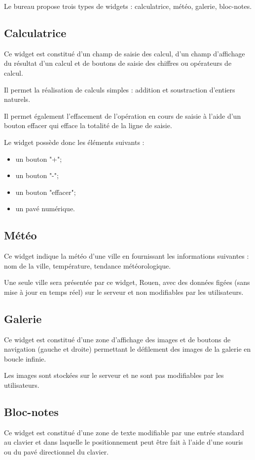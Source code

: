 Le bureau propose {\color{yellow}trois} types de widgets : {\color{red}calculatrice,} météo, galerie, bloc-notes.
{\color{red}
\subsection*{Calculatrice}

Ce widget est constitué d'un champ de saisie des calcul, d'un champ d'affichage du résultat d'un calcul et de boutons de saisie des chiffres ou opérateurs de calcul.

Il permet la réalisation de calculs simples : addition et soustraction d'entiers naturels.

Il permet également l'effacement de l'opération en cours de saisie à l'aide d'un bouton effacer qui efface la totalité de la ligne de saisie.

Le widget possède donc les éléments suivants :
\begin{itemize}
\item un bouton "+";
\item un bouton "-";
\item un bouton "effacer";
\item un pavé numérique.
\end{itemize}
}
\subsection*{Météo}
Ce widget indique la météo d'une ville en fournissant les informations suivantes : nom de la ville, température, tendance météorologique.

Une seule ville sera présentée par ce widget, Rouen, avec des données figées (sans mise à jour en temps réel) sur le serveur et non modifiables par les utilisateurs.

\subsection*{Galerie}
Ce widget est constitué d'une zone d'affichage des images et de boutons de navigation (gauche et droite) permettant le défilement des images de la galerie en boucle infinie.

Les images sont stockées sur le serveur et ne sont pas modifiables par les utilisateurs.

\subsection*{Bloc-notes}
Ce widget est constitué d'une zone de texte modifiable par une entrée standard au clavier et dans laquelle le positionnement peut être fait à l'aide d'une souris ou du pavé directionnel du clavier.